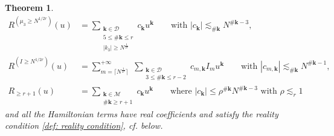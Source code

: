 \documentclass[a4paper,10pt,reqno]{article}
\theoremstyle{definition}
\theoremstyle{plain}
\newtheorem{theorem}[definition]{Theorem}
\theoremstyle{plain}
\theoremstyle{definition}
\theoremstyle{plain}
\theoremstyle{plain}
\theoremstyle{plain}
\theoremstyle{definition}
\theoremstyle{definition}
\def \M{\mathcal{M}}
\def \k{\bm{k}}
\begin{document}
\begin{theorem}
\begin{align}
R^{(\mu_3 \ge N^{1/2r})}(u) &= \sum_{ \substack{ \k \in \mathcal{D} \\ 5 \le \#\k \le r \\ |k_3| \ge N^{\frac{1}{2r}}} } c_{\k} u^{\k} \qquad \text{with $|c_{\k}| \lesssim_{\#\k} N^{\#\k-3}$}, \label{terzo indice grande - thm ham} \\
R^{(I \ge N^{1/2r})}(u) &= \sum_{m = \lceil N^{\frac{1}{2r}} \rceil}^{+\infty} \, \, \sum_{ \substack{ \k \in \mathcal{D} \\ 3 \le \#\k \le r-2} } c_{m,\k} I_m u^{\k} \qquad \text{with $|c_{m,\k}| \lesssim_{\#\k} N^{\#\k-1}$}, \label{azione grande - thm ham} \\
R_{\ge r+1}(u) &= \sum_{ \substack{ \k \in \M \\ \#\k \ge r+1 } } c_{\k} u^{\k} \qquad \text{where $|c_{\k}| \le \rho^{\#\k} N^{\#\k-3}$ with $\rho \lesssim_r 1$} \label{resto grande - thm ham}
\end{align}
and all the Hamiltonian terms have real coefficients and satisfy the reality condition \eqref{def: reality condition}, cf.  below.
\end{theorem}
\end{document}
